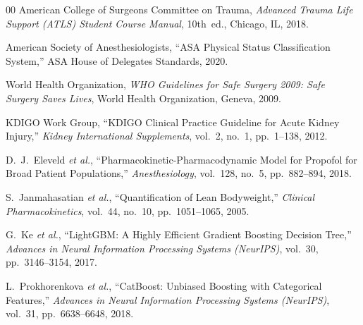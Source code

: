 \documentclass[conference]{IEEEtran}
\begin{document}
\begin{thebibliography}{00}
American College of Surgeons Committee on Trauma, \textit{Advanced Trauma Life Support (ATLS) Student Course Manual}, 10th~ed., Chicago, IL, 2018.

American Society of Anesthesiologists, ``ASA Physical Status Classification System,'' ASA House of Delegates Standards, 2020.

World Health Organization, \textit{WHO Guidelines for Safe Surgery 2009: Safe Surgery Saves Lives}, World Health Organization, Geneva, 2009.

KDIGO Work Group, ``KDIGO Clinical Practice Guideline for Acute Kidney Injury,'' \textit{Kidney International Supplements}, vol.~2, no.~1, pp.~1--138, 2012.

D.~J.~Eleveld \textit{et al.}, ``Pharmacokinetic-Pharmacodynamic Model for Propofol for Broad Patient Populations,'' \textit{Anesthesiology}, vol.~128, no.~5, pp.~882--894, 2018.

S.~Janmahasatian \textit{et al.}, ``Quantification of Lean Bodyweight,'' \textit{Clinical Pharmacokinetics}, vol.~44, no.~10, pp.~1051--1065, 2005.

G.~Ke \textit{et al.}, ``LightGBM: A Highly Efficient Gradient Boosting Decision Tree,'' \textit{Advances in Neural Information Processing Systems (NeurIPS)}, vol.~30, pp.~3146--3154, 2017.

L.~Prokhorenkova \textit{et al.}, ``CatBoost: Unbiased Boosting with Categorical Features,'' \textit{Advances in Neural Information Processing Systems (NeurIPS)}, vol.~31, pp.~6638--6648, 2018.

\end{thebibliography}
\end{document}
